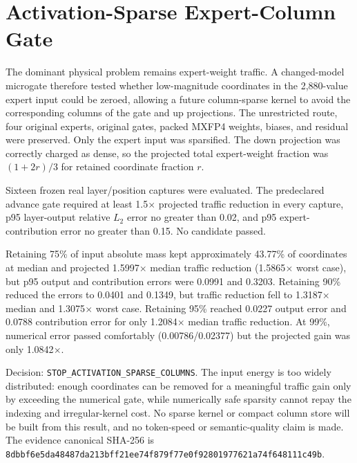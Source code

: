 \section{Activation-Sparse Expert-Column Gate}
\label{sec:gptoss120b-activation-sparse-20260911}

The dominant physical problem remains expert-weight traffic.  A changed-model
microgate therefore tested whether low-magnitude coordinates in the 2,880-value
expert input could be zeroed, allowing a future column-sparse kernel to avoid the
corresponding columns of the gate and up projections.  The unrestricted route,
four original experts, original gates, packed MXFP4 weights, biases, and residual
were preserved.  Only the expert input was sparsified.  The down projection was
correctly charged as dense, so the projected total expert-weight fraction was
$(1+2r)/3$ for retained coordinate fraction $r$.

Sixteen frozen real layer/position captures were evaluated.  The predeclared
advance gate required at least 1.5$\times$ projected traffic reduction in every
capture, p95 layer-output relative $L_2$ error no greater than 0.02, and p95
expert-contribution error no greater than 0.15.  No candidate passed.

Retaining 75\% of input absolute mass kept approximately 43.77\% of coordinates
at median and projected 1.5997$\times$ median traffic reduction (1.5865$\times$
worst case), but p95 output and contribution errors were 0.0991 and 0.3203.
Retaining 90\% reduced the errors to 0.0401 and 0.1349, but traffic reduction
fell to 1.3187$\times$ median and 1.3075$\times$ worst case.  Retaining 95\%
reached 0.0227 output error and 0.0788 contribution error for only
1.2084$\times$ median traffic reduction.  At 99\%, numerical error passed
comfortably (0.00786/0.02377) but the projected gain was only 1.0842$\times$.

Decision: \texttt{STOP\_ACTIVATION\_SPARSE\_COLUMNS}.  The input energy is too
widely distributed: enough coordinates can be removed for a meaningful traffic
gain only by exceeding the numerical gate, while numerically safe sparsity cannot
repay the indexing and irregular-kernel cost.  No sparse kernel or compact column
store will be built from this result, and no token-speed or semantic-quality claim
is made.  The evidence canonical SHA-256 is
\texttt{8dbbf6e5da48487da213bff21ee74f879f77e0f92801977621a74f648111c49b}.
